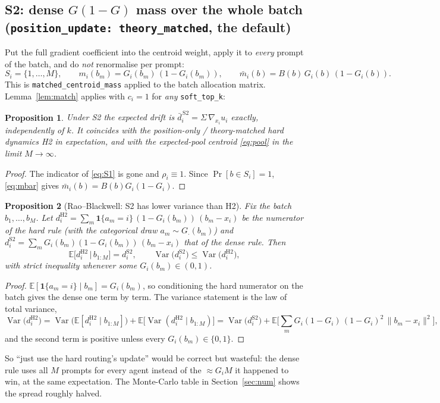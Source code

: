 \documentclass[11pt]{article}
\newtheorem{proposition}{Proposition}
\theoremstyle{remark}
\newcommand{\E}{\mathbb{E}}
\newcommand{\Var}{\operatorname{Var}}
\newcommand{\ind}[1]{\mathbf{1}\{#1\}}
\newcommand{\Sig}{\Sigma}
\newcommand{\cfg}[1]{\texttt{#1}}
\begin{document}
\subsection{S2: dense $G(1-G)$ mass over the whole batch (\cfg{position\_update: theory\_matched}, the default)}
\label{sec:S2}
Put the full gradient coefficient into the centroid weight, apply it to
\emph{every} prompt of the batch, and do \emph{not} renormalise per prompt:
\begin{equation}
  S_i=\{1,\dots,M\},\qquad
  m_i(b_m) = G_i(b_m)\,(1-G_i(b_m)),\qquad
  \bar m_i(b) = B(b)\,G_i(b)\,(1-G_i(b)) .
  \label{eq:S2}
\end{equation}
This is \texttt{matched\_centroid\_mass} applied to the batch allocation
matrix. Lemma~\ref{lem:match} applies with $c_i=1$ for \emph{any}
\cfg{soft\_top\_k}:
\begin{proposition}
\label{prop:S2}
Under S2 the expected drift is $\bar d_i^{\,\mathrm{S2}}=\Sig\,\nabla_{x_i}u_i$
exactly, independently of $k$. It coincides with the position-only /
theory-matched hard dynamics H2 in expectation, and with the expected-pool
centroid \eqref{eq:pool} in the limit $M\to\infty$.
\end{proposition}
\begin{proof}
The indicator of \eqref{eq:S1} is gone and $\rho_i\equiv1$. Since
$\Pr[b\in S_i]=1$, \eqref{eq:mbar} gives $\bar m_i(b)=B(b)G_i(1-G_i)$.
\end{proof}

\begin{proposition}[Rao--Blackwell: S2 has lower variance than H2]
\label{prop:RB}
Fix the batch $b_1,\dots,b_M$. Let $d_i^{\mathrm{H2}}=\sum_m \ind{a_m=i}\,(1-G_i(b_m))\,(b_m-x_i)$
be the numerator of the hard rule (with the categorical draw $a_m\sim G_\cdot(b_m)$)
and $d_i^{\mathrm{S2}}=\sum_m G_i(b_m)(1-G_i(b_m))\,(b_m-x_i)$ that of the dense rule. Then
\[
  \E\big[d_i^{\mathrm{H2}}\,\big|\,b_{1:M}\big]=d_i^{\mathrm{S2}},
  \qquad
  \Var\big(d_i^{\mathrm{S2}}\big)\le\Var\big(d_i^{\mathrm{H2}}\big),
\]
with strict inequality whenever some $G_i(b_m)\in(0,1)$.
\end{proposition}
\begin{proof}
$\E[\ind{a_m=i}\mid b_m]=G_i(b_m)$, so conditioning the hard numerator on
the batch gives the dense one term by term. The variance statement is the
law of total variance,
\[
  \Var\big(d_i^{\mathrm{H2}}\big)
  =\Var\big(\E[d_i^{\mathrm{H2}}\mid b_{1:M}]\big)+\E\big[\Var(d_i^{\mathrm{H2}}\mid b_{1:M})\big]
  =\Var\big(d_i^{\mathrm{S2}}\big)+\E\Big[\sum_m G_i(1-G_i)\,(1-G_i)^2\,\|b_m-x_i\|^2\Big],
\]
and the second term is positive unless every $G_i(b_m)\in\{0,1\}$.
\end{proof}
So ``just use the hard routing's update'' would be correct but wasteful:
the dense rule uses all $M$ prompts for every agent instead of the
$\approx G_i M$ it happened to win, at the same expectation. The
Monte-Carlo table in Section~\ref{sec:num} shows the spread roughly halved.
\end{document}
